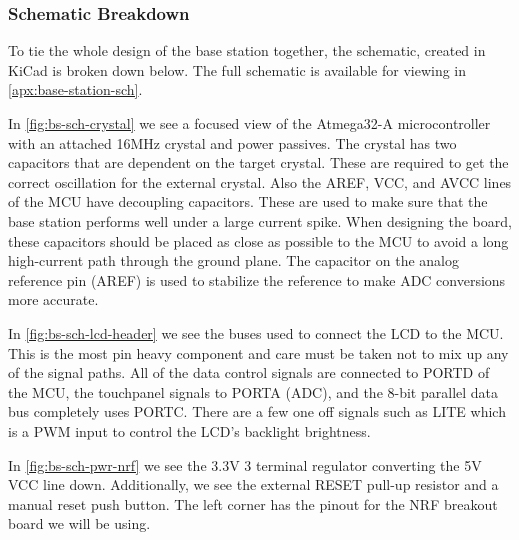 \subsubsection{Schematic Breakdown}
To tie the whole design of the base station together, the schematic, created in KiCad is broken down below. The full schematic is available for viewing in \autoref{apx:base-station-sch}.

In \autoref{fig:bs-sch-crystal} we see a focused view of the Atmega32-A
microcontroller with an attached 16MHz crystal and power passives. The crystal
has two capacitors that are dependent on the target crystal. These are required
to get the correct oscillation for the external crystal. Also the AREF, VCC,
and AVCC lines of the MCU have decoupling capacitors. These are used to make
sure that the base station performs well under a large current spike. When
designing the board, these capacitors should be placed as close as possible to
the MCU to avoid a long high-current path through the ground plane. The
capacitor on the analog reference pin (AREF) is used to stabilize the reference
to make ADC conversions more accurate.


In \autoref{fig:bs-sch-lcd-header} we see the buses used to connect the LCD to the
MCU. This is the most pin heavy component and care must be taken not to mix up
any of the signal paths. All of the data control signals are connected to PORTD
of the MCU, the touchpanel signals to PORTA (ADC), and the 8-bit parallel data
bus completely uses PORTC. There are a few one off signals such as LITE which
is a PWM input to control the LCD's backlight brightness.


In \autoref{fig:bs-sch-pwr-nrf} we see the 3.3V 3 terminal regulator converting the
5V VCC line down. Additionally, we see the external RESET pull-up resistor and
a manual reset push button. The left corner has the pinout for the NRF breakout
board we will be using.



